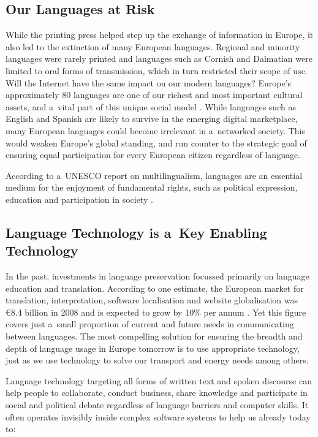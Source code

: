 \begin{multicols}{2}
\subsection{Our Languages at Risk} 

While the printing press helped step up the exchange of information in
Europe, it also led to the extinction of many European languages.
Regional and minority languages were rarely printed and languages such
as Cornish and Dalmatian were limited to oral forms of transmission,
which in turn restricted their scope of use. Will the Internet have
the same impact on our modern languages? Europe’s approximately 80
languages are one of our richest and most important cultural assets,
and a~vital part of this unique social model \cite{EC2}. While
languages such as English and Spanish are likely to survive in the
emerging digital marketplace, many European languages could become
irrelevant in a~networked society. This would weaken Europe’s global
standing, and run counter to the strategic goal of ensuring equal
participation for every European citizen regardless of language. 

According to a~UNESCO report on multilingualism, languages are an
essential medium for the enjoyment of fundamental rights, such as
political expression, education and participation in society
\cite{Unesco1}. 


\subsection{Language Technology is a~Key Enabling Technology} 

In the past, investments in language preservation focussed primarily
on language education and translation. According to one estimate, the
European market for translation, interpretation, software localisation
and website globalisation was €8.4 billion in 2008 and is expected
to grow by 10\% per annum \cite{EC3}. Yet this figure covers just
a~small proportion of current and future needs in communicating
between languages. The most compelling solution for ensuring the
breadth and depth of language usage in Europe tomorrow is to use
appropriate technology, just as we use technology to solve our
transport and energy needs among others. 

Language technology targeting all forms of written text and spoken
discourse can help people to collaborate, conduct business, share
knowledge and participate in social and political debate regardless of
language barriers and computer skills. It often operates invisibly
inside complex software systems to help us already today to: 


\end{multicols}
